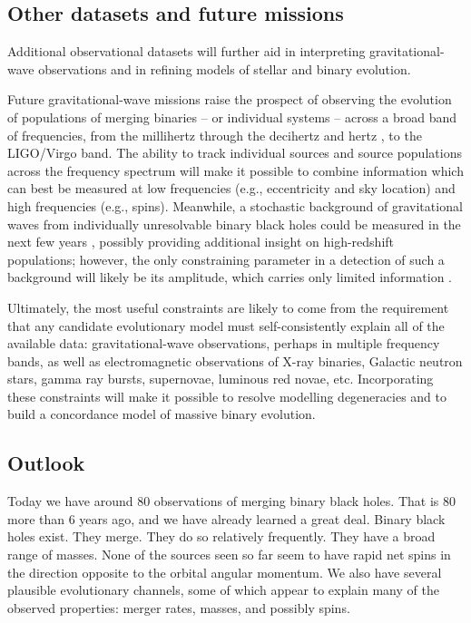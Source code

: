 \documentclass[review]{elsarticle}
\begin{document}
\subsection{Other datasets and future missions}
Additional observational datasets will further aid in interpreting gravitational-wave observations and in refining models of stellar and binary evolution.

Future gravitational-wave missions raise the prospect of observing the evolution of populations of merging binaries -- or individual systems -- across a broad band of frequencies, from the millihertz \citep[e.g.,][]{Sesana:2016} through the decihertz \citep{Mandel:2017} and hertz \citep{ET:2012}, to the LIGO/Virgo band.  The ability to track individual sources and source populations across the frequency spectrum will make it possible to combine information which can best be measured at low frequencies (e.g., eccentricity and sky location) and high frequencies (e.g., spins).  Meanwhile, a stochastic background of gravitational waves from individually unresolvable binary black holes could be measured in the next few years \citep{GW150914:stoch}, possibly providing additional insight on high-redshift populations; however, the only constraining parameter in a detection of such a background will likely be its amplitude, which carries only limited information \citep{Callister:2016}.

Ultimately, the most useful constraints are likely to come from the requirement that any candidate evolutionary model must self-consistently explain all of the available data: gravitational-wave observations, perhaps in multiple frequency bands, as well as electromagnetic observations of X-ray binaries, Galactic neutron stars, gamma ray bursts, supernovae, luminous red novae, etc. Incorporating these constraints will make it possible to resolve modelling degeneracies and to build a concordance model of massive binary evolution.  

\subsection{Outlook}

Today we have around 80 observations of merging binary black holes.  That is 80 more than 6 years ago, and we have already learned a great deal.  Binary black holes exist. They merge. They do so relatively frequently.  They have a broad range of masses. None of the sources seen so far seem to have rapid net spins in the direction opposite to the orbital angular momentum.  We also have several plausible evolutionary channels, some of which appear to explain many of the observed properties: merger rates, masses, and possibly spins. 
\end{document}

